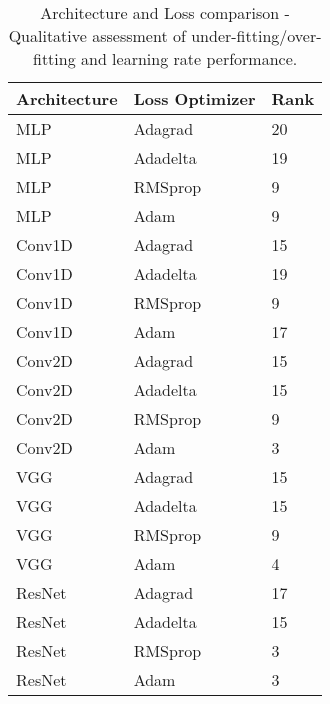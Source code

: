 \begin{table*}[!ht]
    \footnotesize
    \centering
    \begin{tabular}{@{}lll@{}}\toprule
            Architecture & Loss Optimizer & Rank         \\ \hline
            MLP          & Adagrad        & 20   \\
            MLP          & Adadelta       & 19   \\
            MLP          & RMSprop        & 9    \\
            MLP          & Adam           & 9    \\
            Conv1D       & Adagrad        & 15   \\
            Conv1D       & Adadelta       & 19   \\
            Conv1D       & RMSprop        & 9    \\
            Conv1D       & Adam           & 17   \\
            Conv2D       & Adagrad        & 15   \\
            Conv2D       & Adadelta       & 15   \\
            Conv2D       & RMSprop        & 9    \\
            Conv2D       & Adam           & 3    \\
            VGG          & Adagrad        & 15   \\
            VGG          & Adadelta       & 15   \\
            VGG          & RMSprop        & 9    \\
            VGG          & Adam           & 4    \\
            ResNet       & Adagrad        & 17   \\
            ResNet       & Adadelta       & 15   \\
            ResNet       & RMSprop        & 3    \\
            ResNet       & Adam           & 3   \\            \hline
    \end{tabular}
    \caption[Architecture and Loss comparison - Under-fitting/over-fitting]{Architecture and Loss comparison - Qualitative assessment of under-fitting/over-fitting and learning rate performance.}\label{tab:app_res1_validation_MSE}
\end{table*}

